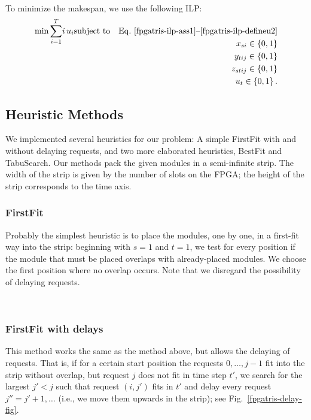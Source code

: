 \documentclass[10pt,journal]{IEEEtran}
\begin{document}
To minimize the makespan, we use the following ILP:

\begin{eqnarray}\label{fpgatris-ilp-complete}
\min \raisebox{0pt}[13pt][0pt]{$\displaystyle \sum_{i=1}^{T}$} i\, u_{i}&
\mbox{\rm subject to} &
{\rm Eq.}~\ref{fpgatris-ilp-ass1}
\mbox{\rm --} \ref{fpgatris-ilp-defineu2}  \\
&& x_{si} \in \{0,1\} \nonumber \\
&& y_{tij} \in \{0,1\}\nonumber \\
&& z_{stij} \in \{0,1\}\nonumber \\
&& u_t \in \{0,1\}\,. \nonumber 
\end{eqnarray}


\subsection{Heuristic Methods}
We implemented several heuristics for our problem:
A simple FirstFit with and without delaying requests,
and two more elaborated heuristics, BestFit and TabuSearch.
Our methods pack the given modules in a semi-infinite strip.
The width of the strip is given by the number of slots on the FPGA; 
the height of
the strip corresponds to the time axis.

\subsubsection{FirstFit} Probably the simplest heuristic is to place the modules,
one by one, in a first-fit way into the strip: 
beginning with $s=1$ and $t=1$,
we test for every position if the module that must be placed overlaps with
already-placed modules. We choose the first position where no overlap 
occurs. Note that we disregard the possibility of delaying requests.

\pagebreak
~\vspace{-0.5cm}
\subsubsection{FirstFit with delays} 
This method works the same as the method above, but
allows the delaying of requests. That is, if for a certain start position 
the requests $0,\ldots,j-1$ fit into the strip without overlap, 
but request $j$ does not fit in time step $t'$, 
we search for the largest $j' < j$ such that
request $(i,j')$ fits in $t'$ and delay every request $j''=j'+1,\ldots$
(i.e., we move them upwards in the strip);
see Fig.~\ref{fpgatris-delay-fig}.
\end{document}

